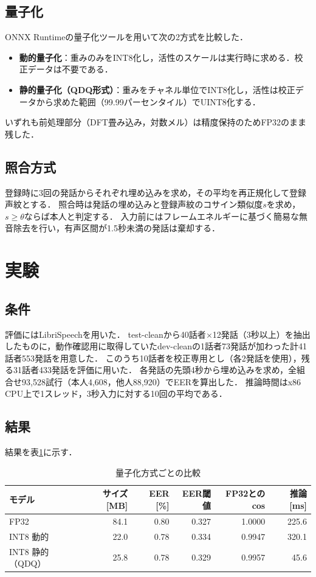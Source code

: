 \documentclass[paper=a4paper,fontsize=10.5pt]{jlreq}
\begin{document}
\subsection{量子化}
ONNX Runtimeの量子化ツールを用いて次の2方式を比較した．
\begin{itemize}
  \item \textbf{動的量子化}：重みのみをINT8化し，活性のスケールは実行時に求める．校正データは不要である．
  \item \textbf{静的量子化（QDQ形式）}：重みをチャネル単位でINT8化し，活性は校正データから求めた範囲（99.99パーセンタイル）でUINT8化する．
\end{itemize}
いずれも前処理部分（DFT畳み込み，対数メル）は精度保持のためFP32のまま残した．

\subsection{照合方式}
登録時に3回の発話からそれぞれ埋め込みを求め，その平均を再正規化して登録声紋とする．
照合時は発話の埋め込みと登録声紋のコサイン類似度$s$を求め，$s \geq \theta$ならば本人と判定する．
入力前にはフレームエネルギーに基づく簡易な無音除去を行い，有声区間が1.5秒未満の発話は棄却する．

\section{実験}

\subsection{条件}
評価にはLibriSpeechを用いた．
test-cleanから40話者$\times$12発話（3秒以上）を抽出したものに，動作確認用に取得していたdev-cleanの1話者73発話が加わった計41話者553発話を用意した．
このうち10話者を校正専用とし（各2発話を使用），残る31話者433発話を評価に用いた．
各発話の先頭4秒から埋め込みを求め，全組合せ93,528試行（本人4,608，他人88,920）でEERを算出した．
推論時間はx86 CPU上で1スレッド，3秒入力に対する10回の平均である．

\subsection{結果}
結果を表\ref{tab:result}に示す．

\begin{table}[htbp]
  \centering
  \caption{量子化方式ごとの比較}
  \label{tab:result}
  \begin{tabular}{lrrrrr}
    \toprule
    モデル & サイズ [MB] & EER [\%] & EER閾値 & FP32とのcos & 推論 [ms] \\
    \midrule
    FP32            & 84.1 & 0.80 & 0.327 & 1.0000 & 225.6 \\
    INT8 動的       & 22.0 & 0.78 & 0.334 & 0.9947 & 320.1 \\
    INT8 静的（QDQ）& 25.8 & 0.78 & 0.329 & 0.9957 & 45.6 \\
    \bottomrule
  \end{tabular}
\end{table}
\end{document}

